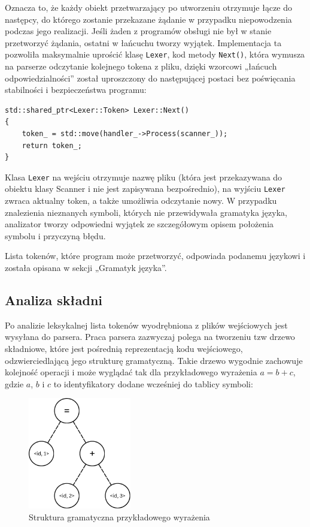 Oznacza to, że każdy obiekt przetwarzający po utworzeniu otrzymuje łącze do następcy, do którego zostanie przekazane żądanie w przypadku niepowodzenia podczas jego realizacji. Jeśli żaden z programów obsługi nie był w stanie przetworzyć żądania, ostatni w łańcuchu tworzy wyjątek. Implementacja ta pozwoliła maksymalnie uprościć klasę \texttt{Lexer}, kod metody \texttt{Next()}, która wymusza na parserze odczytanie kolejnego tokena z pliku, dzięki wzorcowi „łańcuch odpowiedzialności” \cite{cor} został uproszczony do następującej postaci bez poświęcania stabilności i bezpieczeństwa programu:

\begin{lstlisting}[label=list:scanner,caption=Metoda Lexer::Next(),basicstyle=\footnotesize\ttfamily]
std::shared_ptr<Lexer::Token> Lexer::Next()
{
    token_ = std::move(handler_->Process(scanner_));
    return token_;
}
\end{lstlisting}

Klasa \texttt{Lexer} na wejściu otrzymuje nazwę pliku (która jest przekazywana do obiektu klasy Scanner i nie jest zapisywana bezpośrednio), na wyjściu \texttt{Lexer} zwraca aktualny token, a także umożliwia odczytanie nowy. W przypadku znalezienia nieznanych symboli, których nie przewidywała gramatyka języka, analizator tworzy odpowiedni wyjątek ze szczegółowym opisem położenia symbolu i przyczyną błędu.

Lista tokenów, które program może przetworzyć, odpowiada podanemu językowi i została opisana w sekcji „Gramatyk języka”.

\subsection{Analiza składni}

Po analizie leksykalnej lista tokenów wyodrębniona z plików wejściowych jest wysyłana do parsera. Praca parsera zazwyczaj polega na tworzeniu tzw drzewo składniowe, które jest pośrednią reprezentacją kodu wejściowego, odzwierciedlającą jego strukturę gramatyczną. Takie drzewo wygodnie zachowuje kolejność operacji i może wyglądać tak dla przykładowego wyrażenia $a = b + c$, gdzie $a$, $b$ i $c$ to identyfikatory dodane wcześniej do tablicy symboli:

\begin{figure}[h]
    \centering
    \includegraphics[width=0.4\textwidth]{Images/syntax_tree.png}
    \caption{Struktura gramatyczna przykładowego wyrażenia}
\end{figure}

